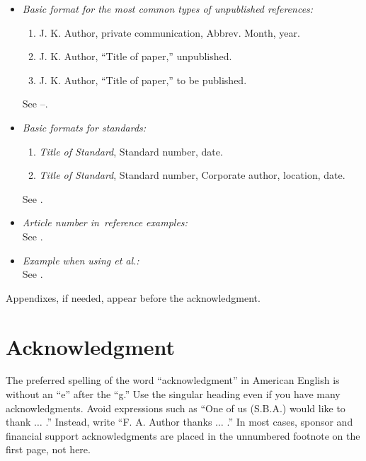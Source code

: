 \documentclass[journal,twoside,web]{ieeecolor}
\begin{document}
\begin{itemize}
\item \emph{Basic format for the most common types of unpublished references:}
\begin{enumerate}
\item J. K. Author, private communication, Abbrev. Month, year.
\item J. K. Author, ``Title of paper,'' unpublished.
\item J. K. Author, ``Title of paper,'' to be published.
\end{enumerate}
See \cite{b27}--\cite{b29}.

\item \emph{Basic formats for standards:}
\begin{enumerate}
\item \emph{Title of Standard}, Standard number, date.
\item \emph{Title of Standard}, Standard number, Corporate author, location, date.
\end{enumerate}
See \cite{b30,b31}.

\item \emph{Article number in~reference examples:}\\
See \cite{b32,b33}.

\item \emph{Example when using et al.:}\\
See \cite{b34}.

\end{itemize}

\appendix

Appendixes, if needed, appear before the acknowledgment.

\section*{Acknowledgment}

The preferred spelling of the word ``acknowledgment'' in American English is 
without an ``e'' after the ``g.'' Use the singular heading even if you have 
many acknowledgments. Avoid expressions such as ``One of us (S.B.A.) would 
like to thank $\ldots$ .'' Instead, write ``F. A. Author thanks $\ldots$ .'' In most 
cases, sponsor and financial support acknowledgments are placed in the 
unnumbered footnote on the first page, not here.
\end{document}
